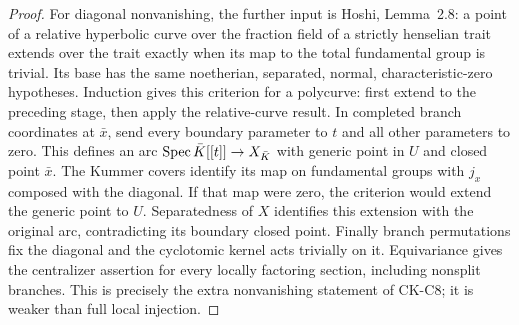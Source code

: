 \begin{proof}
For diagonal nonvanishing, the further input is Hoshi,
Lemma~2.8: a point of a relative hyperbolic curve over the fraction
field of a strictly henselian trait extends over the trait exactly
when its map to the total fundamental group is trivial. Its base
has the same noetherian, separated, normal, characteristic-zero
hypotheses. Induction gives this criterion for a polycurve: first
extend to the preceding stage, then apply the relative-curve result.
In completed branch coordinates at $\bar x$, send every boundary
parameter to $t$ and all other parameters to zero. This defines an
arc $\operatorname{Spec}\bar K[[t]]\to X_{\bar K}$ with generic point in $U$
and closed point $\bar x$. The Kummer covers identify its map on
fundamental groups with $j_x$ composed with the diagonal.
If that map were zero, the criterion would extend the generic
point to $U$. Separatedness of $X$ identifies this extension with
the original arc, contradicting its boundary closed point.
Finally branch permutations fix the diagonal and the cyclotomic
kernel acts trivially on it. Equivariance gives the centralizer
assertion for every locally factoring section, including nonsplit
branches. This is precisely the extra nonvanishing statement of
CK-C8; it is weaker than full local injection.
\end{proof}

